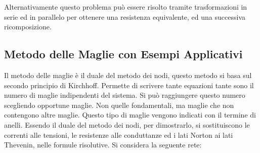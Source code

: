 \documentclass{article}
\numberwithin{equation}{subsection}
\begin{document}
Alternativamente questo problema può essere risolto tramite trasformazioni in serie ed in parallelo per ottenere una resistenza equivalente, ed una successiva ricomposizione. 

\subsection{Metodo delle Maglie con Esempi Applicativi}

Il metodo delle maglie è il duale del metodo dei nodi, questo metodo si basa sul secondo principio di Kirchhoff. Permette di scrivere tante equazioni tante sono il numero di 
maglie indipendenti del sistema. Si può raggiungere questo numero scegliendo opportune maglie. Non quelle fondamentali, ma maglie che non contengono altre maglie. Questo 
tipo di maglie vengono indicati con il termine di anelli. Essendo il duale del metodo dei nodi, per dimostrarlo, si sostituiscono le correnti alle tensioni, le resistenze alle 
conduttanze ed i lati Norton ai lati Thevenin, nelle formule risolutive. 
Si considera la seguente rete:
\begin{center}
\end{center}
\end{document}
